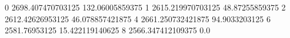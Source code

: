 0 2698.407470703125 132.06005859375
1 2615.219970703125 48.87255859375
2 2612.42626953125 46.078857421875
4 2661.250732421875 94.9033203125
6 2581.76953125 15.422119140625
8 2566.347412109375 0.0
